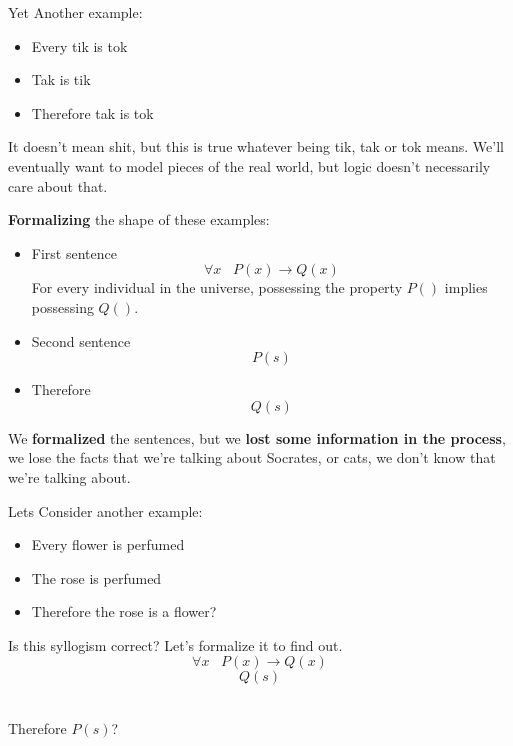 	\begin{example} Yet Another example:
	\begin{itemize}
		\item Every tik is tok
		\item Tak is tik
		\\ \bline
		\item Therefore tak is tok
	\end{itemize}
	\end{example}

	It doesn't mean shit, but this is true whatever being tik, tak or tok means.
	We'll eventually want to model pieces of the real world, but logic doesn't necessarily care about that. \\

	\newpage

	\textbf{Formalizing} the shape of these examples:
	\begin{itemize}
		\item First sentence
		$$ \forall x \;\;\;  P(x) \rightarrow Q(x) $$
			For every individual in the universe, possessing the property \( P() \) implies possessing \( Q() \). \smallvspace

		\item Second sentence
		$$ P(s) $$

		\item Therefore
		$$ Q(s) $$
	\end{itemize}

	We \textbf{formalized} the sentences, but we \textbf{lost some information in the process}, we lose the facts that we're talking about Socrates, or cats, we don't know that we're talking about.

	\begin{example} Lets Consider another example:
	\begin{itemize}
		\item Every flower is perfumed
		\item The rose is perfumed
		\\ \bline
		\item Therefore the rose is a flower?
	\end{itemize}
	\end{example}

	Is this syllogism correct? Let's formalize it to find out. \\
	$$\forall x\;\;\; P(x) \rightarrow Q(x)$$
	$$Q(s)$$
	\begin{center}
		\bline \\
		Therefore $P(s)$? \\
	\end{center}


